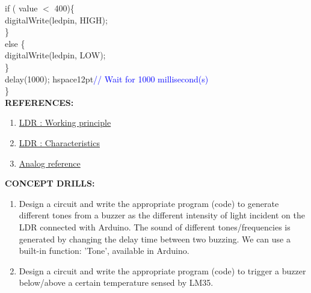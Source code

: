 \documentclass[12pt,a4paper]{article}
\begin{document}
  if ( value $<$ 400)\{\\
  digitalWrite(ledpin, HIGH);\\
 \}\\
  else \{\\
    digitalWrite(ledpin, LOW);\\
  \}\\
  delay(1000); hspace{12pt}\textcolor{blue}{// Wait for 1000 millisecond(s)}\\

 \}\\[21pt]


\setlength{\parindent}{0eM}
\textbf{\large REFERENCES:}
\vspace{-6mm}
\begin{enumerate}
\setlength\itemsep{-0.3em}
\item  \href {https://engineershub.co.in/light-dependent-resistor-working-principle-and-its-applications/}{LDR : Working principle}
\item  \href {https://www.electrical4u.com/light-dependent-resistor-ldr-working-principle-of-ldr/}{LDR : Characteristics}
\item  \href {https://www.arduino.cc/reference/en/language/functions/analog-io/analogreference/}{Analog reference}
\end{enumerate}

\textbf{\large CONCEPT DRILLS:}
\vspace{-6mm}
\begin{justify}
\begin{enumerate}
 \setlength\itemsep{-0.3em}
\item Design a circuit and write the appropriate program (code) to generate different tones from a buzzer as the different intensity of light incident on the LDR connected with Arduino. The sound of different tones/frequencies is generated by changing the delay time between two buzzing. We can use a built-in function: 'Tone', available in Arduino.
\item Design a circuit and write the appropriate program (code) to trigger a buzzer below/above a certain temperature sensed by LM35. 
\end{enumerate}
\end{justify}
\end{document}
